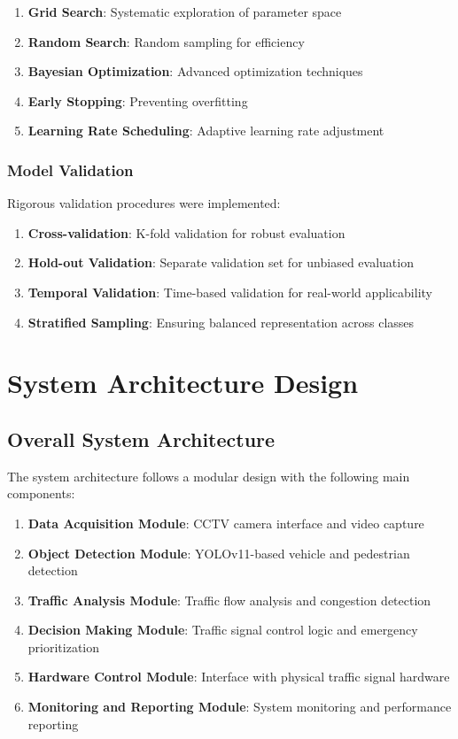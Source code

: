 \begin{enumerate}
    \item \textbf{Grid Search}: Systematic exploration of parameter space
    \item \textbf{Random Search}: Random sampling for efficiency
    \item \textbf{Bayesian Optimization}: Advanced optimization techniques
    \item \textbf{Early Stopping}: Preventing overfitting
    \item \textbf{Learning Rate Scheduling}: Adaptive learning rate adjustment
\end{enumerate}

\subsubsection{Model Validation}

Rigorous validation procedures were implemented:

\begin{enumerate}
    \item \textbf{Cross-validation}: K-fold validation for robust evaluation
    \item \textbf{Hold-out Validation}: Separate validation set for unbiased evaluation
    \item \textbf{Temporal Validation}: Time-based validation for real-world applicability
    \item \textbf{Stratified Sampling}: Ensuring balanced representation across classes
\end{enumerate}

\section{System Architecture Design}

\subsection{Overall System Architecture}

The system architecture follows a modular design with the following main components:

\begin{enumerate}
    \item \textbf{Data Acquisition Module}: CCTV camera interface and video capture
    \item \textbf{Object Detection Module}: YOLOv11-based vehicle and pedestrian detection
    \item \textbf{Traffic Analysis Module}: Traffic flow analysis and congestion detection
    \item \textbf{Decision Making Module}: Traffic signal control logic and emergency prioritization
    \item \textbf{Hardware Control Module}: Interface with physical traffic signal hardware
    \item \textbf{Monitoring and Reporting Module}: System monitoring and performance reporting
\end{enumerate}


